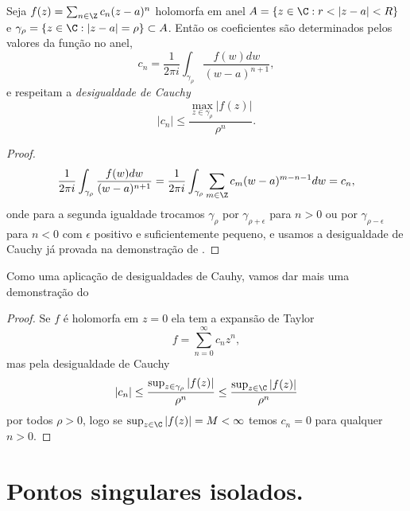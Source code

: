 \begin{teorema}
Seja $f(z) = \sum_{n\in\Z} c_n (z-a)^n$ holomorfa em anel
$A = \{ z\in\C : r < |z-a| < R \}$ e $\gamma_\rho = \{ z\in\C : |z-a|=\rho \} \subset A$.
Então os coeficientes são determinados pelos valores da função no anel,
\begin{equation}
c_n = \frac1{2\pi i} \int_{\gamma_\rho} \frac{f(w) dw}{(w-a)^{n+1}},
\end{equation}
e respeitam a \emph{desigualdade de Cauchy}
\begin{equation}
\label{eq:desigualdade-cauchy}
|c_n| \leq \frac{\max_{z\in\gamma_\rho} |f(z)|}{\rho^n}.
\end{equation}
\end{teorema}
\begin{proof}
\[ \frac1{2\pi i} \int_{\gamma_\rho} \frac{f(w) dw}{(w-a)^{n+1}}
 = \frac1{2\pi i} \int_{\gamma_\rho} \sum_{m\in\Z} c_m (w-a)^{m-n-1} dw 
 = c_n, 
\]
onde para a segunda igualdade trocamos $\gamma_\rho$ por $\gamma_{\rho+\epsilon}$ para
$n>0$ ou por $\gamma_{\rho-\epsilon}$ para $n<0$ com $\epsilon$ positivo e suficientemente pequeno,
e usamos a desigualdade de Cauchy já provada na demonstração de .
\end{proof}

Como uma aplicação de desigualdades de Cauhy, vamos dar mais uma demonstração do 
\liouville*
\begin{proof}
Se $f$ é holomorfa em $z=0$ ela tem a expansão de Taylor
\[ f = \sum_{n=0}^\infty c_n z^n, \]
mas pela desigualdade de Cauchy
\[ |c_n| \leq  \frac{\sup_{z\in\gamma_\rho} |f(z)|}{\rho^n} \leq \frac{\sup_{z\in\C} |f(z)|}{\rho^n} \]
por todos $\rho > 0$, logo se $\sup_{z\in\C} |f(z)| = M < \infty$ temos $c_n = 0$ para qualquer $n>0$.
\end{proof}


\section{Pontos singulares isolados.}

